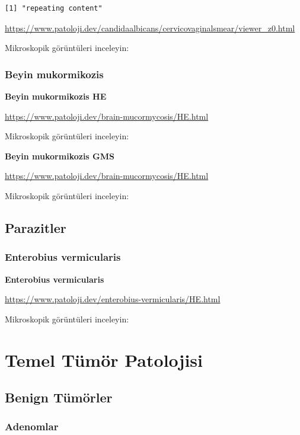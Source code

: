 \documentclass[
  letterpaper,
  DIV=11,
  numbers=noendperiod]{scrreprt}
\begin{document}
\begin{verbatim}
[1] "repeating content"
\end{verbatim}

\url{https://www.patoloji.dev/candidaalbicans/cervicovaginalsmear/viewer_z0.html}

Mikroskopik görüntüleri inceleyin:

\hypertarget{beyin-mukormikozis}{%
\section{Beyin mukormikozis}\label{beyin-mukormikozis}}

\textbf{Beyin mukormikozis HE}

\url{https://www.patoloji.dev/brain-mucormycosis/HE.html}

Mikroskopik görüntüleri inceleyin:

\textbf{Beyin mukormikozis GMS}

\url{https://www.patoloji.dev/brain-mucormycosis/HE.html}

Mikroskopik görüntüleri inceleyin:

\hypertarget{parazitler}{%
\chapter{Parazitler}\label{parazitler}}

\hypertarget{enterobius-vermicularis}{%
\section{Enterobius vermicularis}\label{enterobius-vermicularis}}

\textbf{Enterobius vermicularis}

\url{https://www.patoloji.dev/enterobius-vermicularis/HE.html}

Mikroskopik görüntüleri inceleyin:

\part{Temel Tümör Patolojisi}

\hypertarget{benign-tuxfcmuxf6rler}{%
\chapter{Benign Tümörler}\label{benign-tuxfcmuxf6rler}}

\hypertarget{adenomlar}{%
\section{Adenomlar}\label{adenomlar}}
\end{document}
